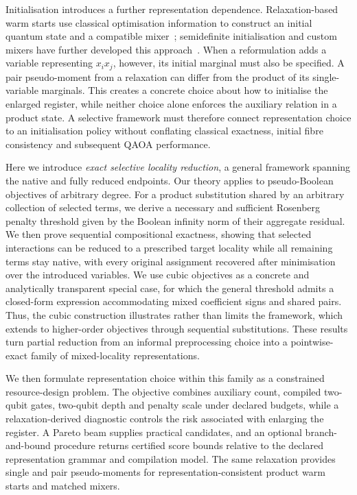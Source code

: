 \documentclass[a4paper,onecolumn,11pt,unpublished]{quantumarticle}
\theoremstyle{remark}
\begin{document}
Initialisation introduces a further representation dependence.
Relaxation-based warm starts use classical optimisation information to
construct an initial quantum state and a compatible
mixer~\cite{Egger2021}; semidefinite initialisation and custom mixers have
further developed this approach~\cite{TateSDP2023,TateCustom2023}.
When a reformulation adds a variable representing $x_i x_j$, however, its
initial marginal must also be specified. A pair pseudo-moment from a
relaxation can differ from the product of its single-variable marginals.
This creates a concrete choice about how to initialise the enlarged
register, while neither choice alone enforces the auxiliary relation in a
product state. A selective framework must therefore connect representation
choice to an initialisation policy without conflating classical exactness,
initial fibre consistency and subsequent QAOA performance.

Here we introduce \emph{exact selective locality reduction}, a general framework spanning the native and fully reduced endpoints. Our theory applies to pseudo-Boolean objectives of arbitrary degree. For a product substitution shared by an arbitrary collection of selected terms, we derive a necessary and sufficient Rosenberg penalty threshold given by the Boolean infinity norm of their aggregate residual. We then prove sequential compositional exactness, showing that selected interactions can be reduced to a prescribed target locality while all remaining terms stay native, with every original assignment recovered after minimisation over the introduced variables. We use cubic objectives as a concrete and analytically transparent special case, for which the general threshold admits a closed-form expression accommodating mixed coefficient signs and shared pairs. Thus, the cubic construction illustrates rather than limits the framework, which extends to higher-order objectives through sequential substitutions. These results turn partial reduction from an informal preprocessing choice into a pointwise-exact family of mixed-locality representations.


We then formulate representation choice within this family as a constrained
resource-design problem. The objective combines auxiliary count, compiled
two-qubit gates, two-qubit depth and penalty scale under declared budgets, while
a relaxation-derived diagnostic controls the risk associated with enlarging
the register. A Pareto beam supplies practical candidates, and an optional
branch-and-bound procedure returns certified score bounds relative to the
declared representation grammar and compilation model. The same relaxation
provides single and pair pseudo-moments for representation-consistent product
warm starts and matched mixers.
\end{document}
